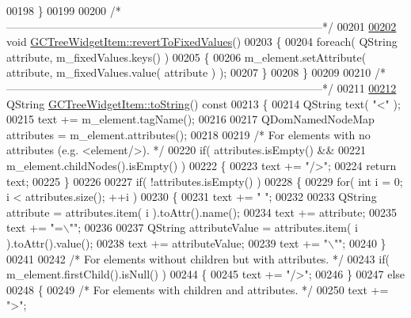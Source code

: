 \begin{DoxyCode}
00198 \}
00199 
00200 \textcolor{comment}{/*
      --------------------------------------------------------------------------------------*/}
00201 
\hypertarget{gctreewidgetitem_8cpp_source_l00202}{}\hyperlink{class_g_c_tree_widget_item_ab9be6bb99410543a6238c9ad48f2a9f7}{00202} \textcolor{keywordtype}{void} \hyperlink{class_g_c_tree_widget_item_ab9be6bb99410543a6238c9ad48f2a9f7}{GCTreeWidgetItem::revertToFixedValues}()
00203 \{
00204   \textcolor{keywordflow}{foreach}( QString attribute, m\_fixedValues.keys() )
00205   \{
00206     m\_element.setAttribute( attribute, m\_fixedValues.value( attribute ) );
00207   \}
00208 \}
00209 
00210 \textcolor{comment}{/*
      --------------------------------------------------------------------------------------*/}
00211 
\hypertarget{gctreewidgetitem_8cpp_source_l00212}{}\hyperlink{class_g_c_tree_widget_item_acbd4573d56cc5c6d9bd58c461b797115}{00212} QString \hyperlink{class_g_c_tree_widget_item_acbd4573d56cc5c6d9bd58c461b797115}{GCTreeWidgetItem::toString}()\textcolor{keyword}{ const}
00213 \textcolor{keyword}{}\{
00214   QString text( \textcolor{stringliteral}{"<"} );
00215   text += m\_element.tagName();
00216 
00217   QDomNamedNodeMap attributes = m\_element.attributes();
00218 
00219   \textcolor{comment}{/* For elements with no attributes (e.g. <element/>). */}
00220   \textcolor{keywordflow}{if}( attributes.isEmpty() &&
00221       m\_element.childNodes().isEmpty() )
00222   \{
00223     text += \textcolor{stringliteral}{"/>"};
00224     \textcolor{keywordflow}{return} text;
00225   \}
00226 
00227   \textcolor{keywordflow}{if}( !attributes.isEmpty() )
00228   \{
00229     \textcolor{keywordflow}{for}( \textcolor{keywordtype}{int} i = 0; i < attributes.size(); ++i )
00230     \{
00231       text += \textcolor{stringliteral}{" "};
00232 
00233       QString attribute = attributes.item( i ).toAttr().name();
00234       text += attribute;
00235       text += \textcolor{stringliteral}{"=\(\backslash\)""};
00236 
00237       QString attributeValue = attributes.item( i ).toAttr().value();
00238       text += attributeValue;
00239       text += \textcolor{stringliteral}{"\(\backslash\)""};
00240     \}
00241 
00242     \textcolor{comment}{/* For elements without children but with attributes. */}
00243     \textcolor{keywordflow}{if}( m\_element.firstChild().isNull() )
00244     \{
00245       text += \textcolor{stringliteral}{"/>"};
00246     \}
00247     \textcolor{keywordflow}{else}
00248     \{
00249       \textcolor{comment}{/* For elements with children and attributes. */}
00250       text += \textcolor{stringliteral}{">"};

\end{DoxyCode}
